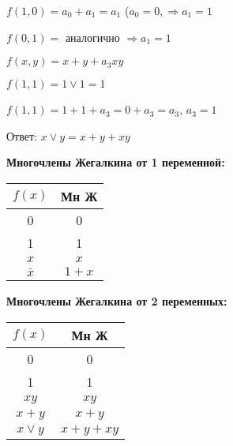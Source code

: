 \documentclass[russian]{lecture-notes}
\begin{document}
\begin{sloppypar}
\begin{proposition}
\begin{example}
                $f(1,0) = a_{0} + a_{1} = a_{1}$ ($a_{0} = 0, \Rightarrow a_{1} = 1$

                $f(0,1) =$ аналогично $\Rightarrow a_{1} = 1$

                $f(x,y) = x+y + a_{3}xy$

                $f(1,1) = 1 \lor 1 = 1$

                $f(1,1) = 1 + 1 + a_{3} = 0 + a_{3} = a_{3}$, $a_{3}=1$

                Ответ: $x\lor y = x+y+xy$

            \end{example}

        \end{proposition}

        \textbf{Многочлены Жегалкина от 1 переменной:}

        \begin{table}[h!]
            \centering
            \begin{tabular}{|c|c|}
                \hline
                $f(x)$  & Мн Ж    \\ \hline
                0       & 0       \\ \hline
                1       & 1       \\ \hline
                $x$       & $x$     \\ \hline
                $\bar{x}$ & $1 + x$ \\ \hline
            \end{tabular}
        \end{table}

        \textbf{Многочлены Жегалкина от 2 переменных:}

        \begin{table}[h!]
            \centering
            \begin{tabular}{|c|c|}
                \hline
                $f(x)$   & Мн Ж         \\ \hline
                0        & 0            \\ \hline
                1        & 1            \\ \hline
                $xy$       & $xy$         \\ \hline
                $x + y$    & $x + y$      \\ \hline
                $x \lor y$ & $x + y + xy$ \\ \hline
            \end{tabular}
        \end{table}


\end{sloppypar}
\end{document}
